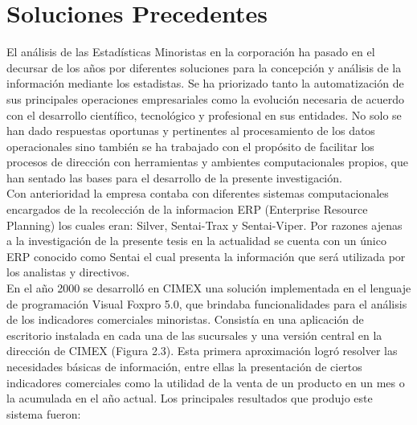 \section*{Soluciones Precedentes}\label{sol_presed}
El análisis de las Estadísticas Minoristas en la corporación ha pasado en el decursar de los años por diferentes soluciones para la concepción y análisis de la información mediante los estadistas. Se ha priorizado tanto la automatización de sus principales operaciones empresariales como la evolución necesaria de acuerdo con el desarrollo científico, tecnológico y profesional en sus entidades. No solo se han dado respuestas oportunas y pertinentes al procesamiento de los datos operacionales sino también se ha trabajado con el propósito de facilitar los procesos de dirección con herramientas y ambientes computacionales propios, que han sentado las bases para el desarrollo de la presente investigación.\\

Con anterioridad la empresa contaba con diferentes sistemas computacionales encargados de la recolección de la informacion ERP (Enterprise Resource Planning) los cuales eran: Silver, Sentai-Trax y Sentai-Viper. Por razones ajenas a la investigación de la presente tesis en la actualidad se cuenta con un único ERP conocido como Sentai el cual presenta la información que será utilizada por los analistas y directivos.\\

En el año 2000 se desarrolló en CIMEX una solución implementada en el lenguaje de programación Visual Foxpro 5.0, que brindaba funcionalidades para el análisis de los indicadores comerciales minoristas. Consistía en una aplicación de escritorio instalada en cada una de las sucursales y una versión central en la dirección de CIMEX (Figura 2.3). Esta primera aproximación logró resolver las necesidades básicas de información, entre ellas la presentación de ciertos indicadores comerciales como la utilidad de la venta de un producto en un mes o la acumulada en el año actual. Los principales resultados que produjo este sistema fueron: 

